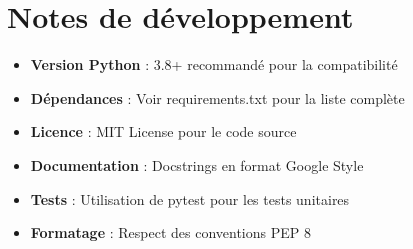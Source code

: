 \section{Notes de développement}
\begin{itemize}
    \item \textbf{Version Python} : 3.8+ recommandé pour la compatibilité
    \item \textbf{Dépendances} : Voir requirements.txt pour la liste complète
    \item \textbf{Licence} : MIT License pour le code source
    \item \textbf{Documentation} : Docstrings en format Google Style
    \item \textbf{Tests} : Utilisation de pytest pour les tests unitaires
    \item \textbf{Formatage} : Respect des conventions PEP 8
\end{itemize} 